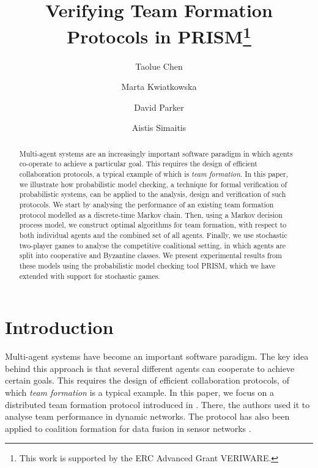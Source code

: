 \documentclass{llncs}
\newcommand{\taolue}[1]{\marginpar{\footnotesize \color{red} {\bf TL:} \textsf{#1}}}
\newcommand{\comment}[1]{\marginpar{\footnotesize \color{red} \textsf{#1}}}
\begin{document}
\title{Verifying Team Formation Protocols in PRISM\thanks{This work is supported by
the ERC Advanced Grant VERIWARE.}}
\author{Taolue Chen \and Marta Kwiatkowska \and David Parker \and Aistis Simaitis}
\email{}

\maketitle

\begin{abstract}
Multi-agent systems are an increasingly important software paradigm
in which agents co-operate to achieve a particular goal.
This requires the design of efficient collaboration protocols,
a typical example of which is \emph{team formation}.
In this paper, we illustrate how probabilistic model checking,
a technique for formal verification of probabilistic systems,
can be applied to the analysis, design and verification of such protocols.
We start by analysing the performance of an existing team formation protocol
modelled as a discrete-time Markov chain.
Then, using a Markov decision process model,
we construct optimal algorithms for team formation,
with respect to both individual agents and the combined set of all agents.
Finally, we use stochastic two-player games to analyse the competitive coalitional setting,
in which agents are split into cooperative and Byzantine classes.
We present experimental results from these models
using the probabilistic model checking tool PRISM,
which we have extended with support for stochastic games.
\end{abstract}

\section{Introduction}

\comment{Add some comments about complexity}
Multi-agent systems have become an important software paradigm.
The key idea behind this approach is that several different agents can cooperate to achieve certain goals.
This requires the design of efficient collaboration protocols, of which \emph{team formation} is a typical example. In this paper, we focus on a distributed team formation protocol introduced in \cite{gaston2005agent}. There, the authors used it to analyse team performance in dynamic networks.
The protocol %
has also been applied to coalition formation for data fusion in sensor networks \cite{glinton2008agent}.
\end{document}
